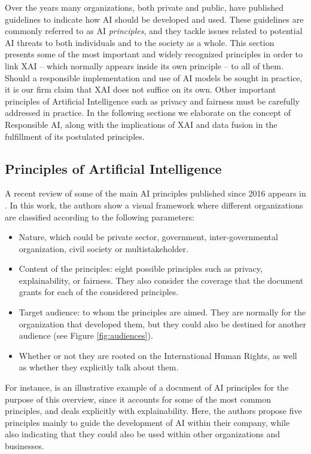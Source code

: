 \documentclass[final]{elsarticle}
\begin{document}
Over the years many organizations, both private and public, have published guidelines to indicate how AI should be developed and used. These guidelines are commonly referred to as AI \emph{principles}, and they tackle issues related to potential AI threats to both individuals and to the society as a whole. This section presents some of the most important and widely recognized principles in order to link XAI -- which normally appears inside its own principle -- to all of them. Should a responsible implementation and use of AI models be sought in practice, it is our firm claim that XAI does not suffice on its own. Other important principles of Artificial Intelligence such as privacy and fairness must be carefully addressed in practice. In the following sections we elaborate on the concept of Responsible AI, along with the implications of XAI and data fusion in the fulfillment of its postulated principles.

\subsection{Principles of Artificial Intelligence} \label{ssec:principlesAI}

A recent review of some of the main AI principles published since 2016 appears in \cite{fjeld2019principled}. In this work, the authors show a visual framework where different organizations are classified according to the following parameters:
\begin{itemize}[leftmargin=*]
\item Nature, which could be private sector, government, inter-governmental organization, civil society or multistakeholder.

\item Content of the principles: eight possible principles such as privacy, explainability, or fairness. They also consider the coverage that the document grants for each of the considered principles.

\item Target audience: to whom the principles are aimed. They are normally for the organization that developed them, but they could also be destined for another audience (see Figure \ref{fig:audiences}).

\item Whether or not they are rooted on the International Human Rights, as well as whether they explicitly talk about them.
\end{itemize}

For instance, \cite{benjamins2019responsible} is an illustrative example of a document of AI principles for the purpose of this overview, since it accounts for some of the most common principles, and deals explicitly with explainability. Here, the authors propose five principles mainly to guide the development of AI within their company, while also indicating that they could also be used within other organizations and businesses. 
\end{document}
